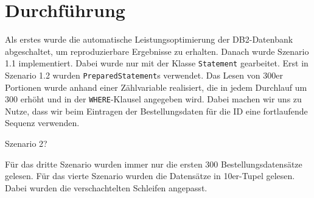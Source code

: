 \chapter{Durchführung}
Als erstes wurde die automatische Leistungsoptimierung der DB2-Datenbank abgeschaltet, um reproduzierbare Ergebnisse zu erhalten. Danach wurde Szenario 1.1 implementiert. Dabei wurde nur mit der Klasse \texttt{Statement} gearbeitet. Erst in Szenario 1.2 wurden \texttt{PreparedStatement}s verwendet. Das Lesen von 300er Portionen wurde anhand einer Zählvariable realisiert, die in jedem Durchlauf um 300 erhöht und in der \texttt{WHERE}-Klausel angegeben wird. Dabei machen wir uns zu Nutze, dass wir beim Eintragen der Bestellungsdaten für die ID eine fortlaufende Sequenz verwenden.

Szenario 2?

Für das dritte Szenario wurden immer nur die ersten 300 Bestellungsdatensätze gelesen. Für das vierte Szenario wurden die Datensätze in 10er-Tupel gelesen. Dabei wurden die verschachtelten Schleifen angepasst.